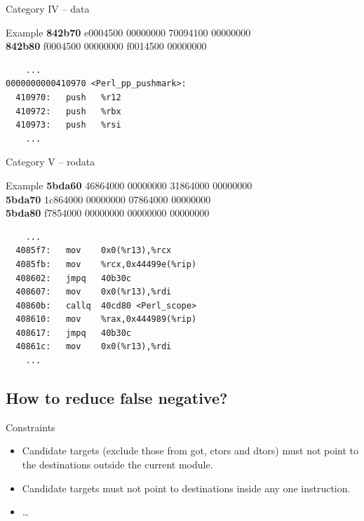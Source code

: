 \documentclass{beamer}
\begin{document}
\begin{frame}[fragile]{Category IV -- data}
    \begin{exampleblock}{Example}
        \textbf{842b70} e0004500 00000000 \alert{70094100 00000000}\\
        \textbf{842b80} f0004500 00000000 f0014500 00000000
        \begin{verbatim}
    ...
0000000000410970 <Perl_pp_pushmark>:
  410970:	push   %r12
  410972:	push   %rbx
  410973:	push   %rsi
    ...
        \end{verbatim}
    \end{exampleblock}
\end{frame}

\begin{frame}[fragile]{Category V -- rodata}
    \begin{exampleblock}{Example}
        \textbf{5bda60} 46864000 00000000 31864000 00000000 \\
        \textbf{5bda70} 1c864000 00000000 07864000 00000000 \\
        \textbf{5bda80} \alert{f7854000} 00000000 00000000 00000000
        \begin{verbatim}
    ...
  4085f7:	mov    0x0(%r13),%rcx
  4085fb:	mov    %rcx,0x44499e(%rip)
  408602:	jmpq   40b30c
  408607:	mov    0x0(%r13),%rdi
  40860b:	callq  40cd80 <Perl_scope>
  408610:	mov    %rax,0x444989(%rip)
  408617:	jmpq   40b30c
  40861c:	mov    0x0(%r13),%rdi
    ...
        \end{verbatim}
    \end{exampleblock}
\end{frame}

\subsection{How to reduce false negative?}

\begin{frame}{Constraints}
    \begin{itemize}
        \item
            Candidate targets (exclude those from got, ctors and dtors) must
            not point to the destinations outside the current module.
            \pause
        \item
            Candidate targets must not point to destinations inside any one
            instruction.
            \pause
        \item
            \ldots
    \end{itemize}
\end{frame}
\end{document}

